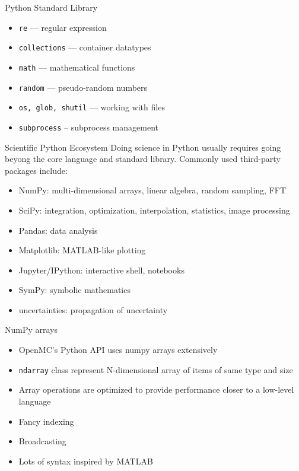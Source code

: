 \documentclass[noamssymb,svgnames]{beamer}
\begin{document}
\begin{frame}{Python Standard Library}
  \begin{itemize}
  \item \texttt{re} --- regular expression
  \item \texttt{collections} --- container datatypes
  \item \texttt{math} --- mathematical functions
  \item \texttt{random} --- pseudo-random numbers
  \item \texttt{os, glob, shutil} --- working with files
  \item \texttt{subprocess} -- subprocess management
  \end{itemize}
\end{frame}

\begin{frame}{Scientific Python Ecosystem}
  Doing science in Python usually requires going beyong the core language and
  standard library. Commonly used third-party packages include:
  \begin{itemize}
  \item NumPy: multi-dimensional arrays, linear algebra, random sampling, FFT
  \item SciPy: integration, optimization, interpolation, statistics, image
    processing
  \item Pandas: data analysis
  \item Matplotlib: MATLAB-like plotting
  \item Jupyter/IPython: interactive shell, notebooks
  \item SymPy: symbolic mathematics
  \item uncertainties: propagation of uncertainty
  \end{itemize}
\end{frame}

\begin{frame}{NumPy arrays}
  \begin{itemize}
  \item OpenMC's Python API uses numpy arrays extensively
  \item \texttt{ndarray} class represent N-dimensional array of items of same
    type and size
  \item Array operations are optimized to provide performance closer to a
    low-level language
  \item Fancy indexing
  \item Broadcasting
  \item Lots of syntax inspired by MATLAB
  \end{itemize}
\end{frame}
\end{document}
